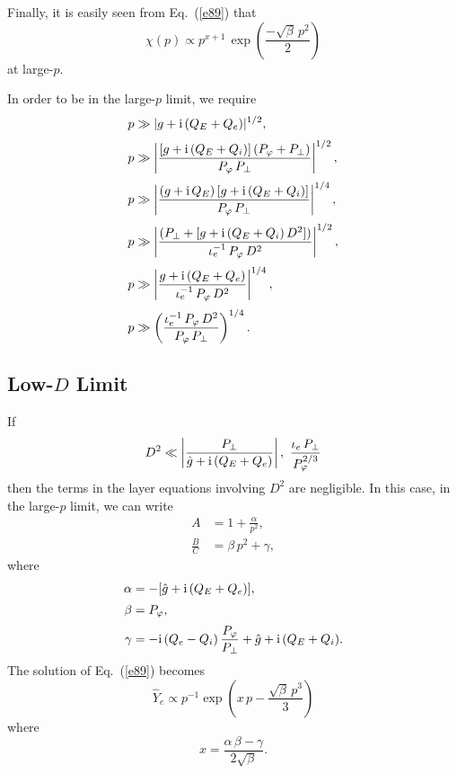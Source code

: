 \documentclass[titlepage=false,12pt]{article}
\begin{document}
Finally, it is easily seen from Eq.~(\ref{e89}) that
\begin{equation}
\chi(p) \propto p^{x+1}\,\exp\left(\frac{-\sqrt{\beta}\,p^2}{2}\right)
\end{equation}
at large-$p$. 

In order to be in the large-$p$ limit, we require
\begin{align}
p&\gg |g+{\rm i}\,(Q_E+Q_e)|^{1/2},\\[0.5ex]
p&\gg\left|\frac{[g+{\rm i}\,(Q_E+Q_i)]\,(P_\varphi + P_\perp)}{P_\varphi\,P_\perp}\right|^{1/2},\\[0.5ex]
p&\gg \left|\frac{(g+{\rm i}\,Q_E)\,[g+{\rm i}\,(Q_E+Q_i)]}{P_\varphi\,P_\perp}\right|^{1/4},\\[0.5ex]
p&\gg \left|\frac{(P_\perp+[g+{\rm i}\,(Q_E+Q_i)\,D^2])}{\iota_e^{-1}\,P_\varphi\,D^2}\right|^{1/2},\\[0.5ex]
p&\gg \left|\frac{g+{\rm i}\,(Q_E+Q_e)}{\iota_e^{-1}\,P_\varphi\,D^2}\right|^{1/4},\\[0.5ex]
p&\gg \left(\frac{\iota_e^{-1}\,P_\varphi\,D^2}{P_\varphi\,P_\perp}\right)^{1/4}.
\end{align} 

\subsection{Low-$D$ Limit}\label{lowd}
If
\begin{align}
D^2\ll \left|\frac{P_\perp}{\hat{g} + {\rm i}\,(Q_E+Q_e)}\right|, ~\frac{\iota_e\,P_\perp}{P_\varphi^{2/3}}
\end{align}
then the terms in the layer equations involving $D^2$ are negligible. In this case, in the large-$p$ limit,  we can write
\begin{align}
A&= 1+\frac{\alpha}{p^2},\\[0.5ex]
\frac{B}{C} &= \beta\,p^2+\gamma,
\end{align}
where
\begin{align}
\alpha &= - [\hat{g}+{\rm i}\,(Q_E+Q_e)],\\[0.5ex]
\beta &= P_\varphi,\\[0.5ex]
\gamma&= -{\rm i}\,(Q_e-Q_i)\,\frac{P_\varphi}{P_\perp} + \hat{g} + {\rm i}\,(Q_E+Q_i).
\end{align}
The solution of Eq.~(\ref{e89}) becomes
\begin{equation}
\hat{Y}_e\propto p^{-1}\exp\left(x\,p - \frac{\sqrt{\beta}\,p^3}{3}\right)
\end{equation}
where
\begin{equation}
x = \frac{\alpha\,\beta-\gamma}{2\sqrt{\beta}}.
\end{equation}
\end{document}
